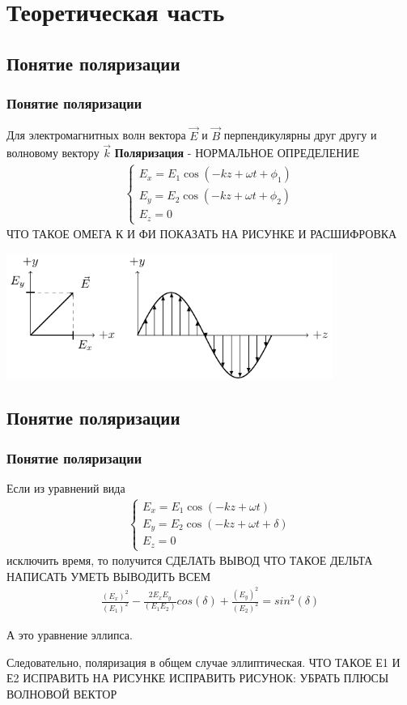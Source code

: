 \documentclass[10pt,pdf,hyperref={unicode}, dvipsnames, handout]{beamer}
\begin{document}
\section{Теоретическая часть}
\begin{frame}[t]
	\subsection{Понятие поляризации}
	\frametitle{Понятие поляризации}
	Для электромагнитных волн вектора $\vec{E}$ и $\vec{B}$ перпендикулярны друг другу и волновому вектору $\vec{k}$
	\textbf{Поляризация} - НОРМАЛЬНОЕ ОПРЕДЕЛЕНИЕ	
	\begin{gather}
		\begin{cases} 
			E_x = E_1\cos\left(-kz+\omega t+ \phi_1\right) \\
			E_y = E_2\cos\left(-kz+\omega t+ \phi_2\right) \\
			E_z = 0
		\end{cases}
	\end{gather}
	ЧТО ТАКОЕ ОМЕГА К И ФИ ПОКАЗАТЬ НА РИСУНКЕ И РАСШИФРОВКА
	\begin{center}
		\includegraphics[width=0.8\textwidth]{img/e}
	\end{center}
\end{frame}
\begin{frame}
\subsection{Понятие поляризации}
	\frametitle{Понятие поляризации}
Если из уравнений вида 
	\begin{gather}
		\begin{cases} 
			E_x = E_1\cos\left(-kz+\omega t\right) \\
			E_y = E_2\cos\left(-kz+\omega t+\delta\right) \\
			E_z = 0
		\end{cases}
	\end{gather}
исключить время, то получится
СДЕЛАТЬ ВЫВОД ЧТО ТАКОЕ ДЕЛЬТА НАПИСАТЬ УМЕТЬ ВЫВОДИТЬ ВСЕМ
\begin{gather}
\frac{(E_x)^2}{(E_1)^2}-\frac{2E_xE_y}{(E_1E_2)}cos(\delta)+\frac{(E_y)^2}{(E_2)^2}=sin^2(\delta)
\end{gather}

А это уравнение эллипса.

Следовательно, поляризация в общем случае эллиптическая. ЧТО ТАКОЕ Е1 И Е2 ИСПРАВИТЬ НА РИСУНКЕ ИСПРАВИТЬ РИСУНОК:
УБРАТЬ ПЛЮСЫ
ВОЛНОВОЙ ВЕКТОР

\end{frame}
\end{document}
